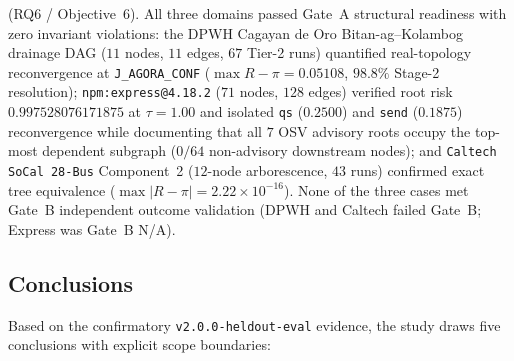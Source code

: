 \begin{enumerate}[label=\arabic*.,leftmargin=*]
{(RQ6 / Objective~6).} All three domains passed Gate~A structural
readiness with zero invariant violations: the DPWH Cagayan de Oro
Bitan-ag--Kolambog drainage DAG ($11$ nodes, $11$ edges, $67$ Tier-2
runs) quantified real-topology reconvergence at \texttt{J\_AGORA\_CONF}
($\max R - \pi = 0.05108$, $98.8\%$ Stage-2 resolution);
\texttt{npm:express@4.18.2} ($71$ nodes, $128$ edges) verified root
risk $0.997528076171875$ at $\tau=1.00$ and isolated \texttt{qs}
($0.2500$) and \texttt{send} ($0.1875$) reconvergence while documenting
that all $7$ OSV advisory roots occupy the top-most dependent subgraph
($0/64$ non-advisory downstream nodes); and \texttt{Caltech SoCal
28-Bus} Component~2 ($12$-node arborescence, $43$ runs) confirmed exact
tree equivalence ($\max|R-\pi| = 2.22\times 10^{-16}$). None of the
three cases met Gate~B independent outcome validation (DPWH and Caltech
failed Gate~B; Express was Gate~B N/A).
\end{enumerate}

\subsection{Conclusions}

Based on the confirmatory \texttt{v2.0.0-heldout-eval} evidence, the
study draws five conclusions with explicit scope boundaries:


